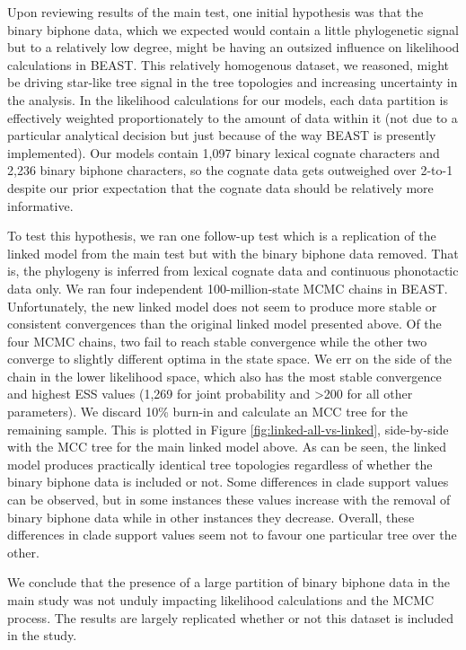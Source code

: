 Upon reviewing results of the main test, one initial hypothesis was that the binary biphone data, which we expected would contain a little phylogenetic signal but to a relatively low degree, might be having an outsized influence on likelihood calculations in BEAST. This relatively homogenous dataset, we reasoned, might be driving star-like tree signal in the tree topologies and increasing uncertainty in the analysis. In the likelihood calculations for our models, each data partition is effectively weighted proportionately to the amount of data within it (not due to a particular analytical decision but just because of the way BEAST is presently implemented). Our models contain 1,097 binary lexical cognate characters and 2,236 binary biphone characters, so the cognate data gets outweighed over 2-to-1 despite our prior expectation that the cognate data should be relatively more informative.

To test this hypothesis, we ran one follow-up test which is a replication of the linked model from the main test but with the binary biphone data removed. That is, the phylogeny is inferred from lexical cognate data and continuous phonotactic data only. We ran four independent 100-million-state MCMC chains in BEAST. Unfortunately, the new linked model does not seem to produce more stable or consistent convergences than the original linked model presented above. Of the four MCMC chains, two fail to reach stable convergence while the other two converge to slightly different optima in the state space. We err on the side of the chain in the lower likelihood space, which also has the most stable convergence and highest ESS values (1,269 for joint probability and \textgreater{}200 for all other parameters). We discard 10\% burn-in and calculate an MCC tree for the remaining sample. This is plotted in Figure \ref{fig:linked-all-vs-linked}, side-by-side with the MCC tree for the main linked model above. As can be seen, the linked model produces practically identical tree topologies regardless of whether the binary biphone data is included or not. Some differences in clade support values can be observed, but in some instances these values increase with the removal of binary biphone data while in other instances they decrease. Overall, these differences in clade support values seem not to favour one particular tree over the other.

We conclude that the presence of a large partition of binary biphone data in the main study was not unduly impacting likelihood calculations and the MCMC process. The results are largely replicated whether or not this dataset is included in the study.

